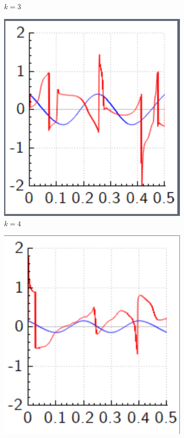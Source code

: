 \documentclass[aps,pra,reprint,superscriptaddress]{revtex4-1}
\begin{document}
\begin{figure}
\begin{subfigure}{0.4\columnwidth}
		\caption{$k=3$}
	\end{subfigure}
	\begin{subfigure}{0.4\columnwidth}
		\includegraphics[width=\columnwidth]{graphics/similar_solutions/k4.PNG}
		\caption{$k=4$}
	\end{subfigure}
	\begin{subfigure}{0.4\columnwidth}
		\includegraphics[width=\columnwidth]{graphics/similar_solutions/k5.PNG}

\end{subfigure}
\end{figure}
\end{document}
